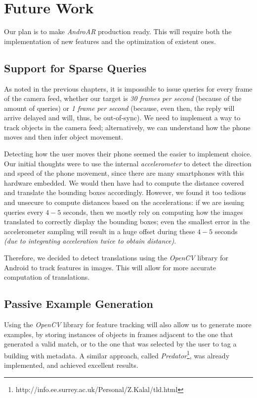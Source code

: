\documentclass[a4paper,onecolumn,oneside,titlepage,11pt]{report}
\begin{document}
\chapter{Future Work}
\label{chap:conclusions}
Our plan is to make \emph{AndroAR} production ready. This will require both the implementation of new features and the optimization of existent ones.

\section*{Support for Sparse Queries}
As noted in the previous chapters, it is impossible to issue queries for every frame of the camera feed, whether our target is \emph{30 frames per second} (because of the amount of queries) or \emph{1 frame per second} (because, even then, the reply will arrive delayed and will, thus, be out-of-sync). We need to implement a way to track objects in the camera feed; alternatively, we can understand how the phone moves and then infer object movement.

Detecting how the user moves their phone seemed the easier to implement choice. Our initial thoughts were to use the internal \emph{accelerometer} to detect the direction and speed of the phone movement, since there are many smartphones with this hardware embedded. We would then have had to compute the distance covered and translate the bounding boxes accordingly. However, we found it too tedious and unsecure to compute distances based on the accelerations: if we are issuing queries every $4-5$ seconds, then we mostly rely on computing how the images translated to correctly display the bounding boxes; even the smallest error in the accelerometer sampling will result in a huge offset during these $4-5$ seconds \emph{(due to integrating acceleration \emph{twice} to obtain distance)}.

Therefore, we decided to detect translations using the \emph{OpenCV} library for Android to track features in images. This will allow for more accurate computation of translations.

\section*{Passive Example Generation}
Using the \emph{OpenCV} library for feature tracking will also allow us to generate more examples, by storing instances of objects in frames adjacent to the one that generated a valid match, or to the one that was selected by the user to tag a building with metadata. A similar approach, called \emph{Predator}\footnote{http://info.ee.surrey.ac.uk/Personal/Z.Kalal/tld.html}, was already implemented, and achieved excellent results.
\end{document}
